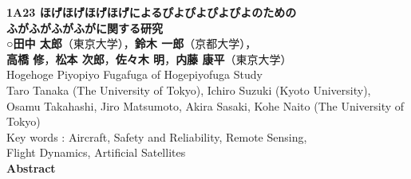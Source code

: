 \documentclass[9pt,a4paper]{ltjsarticle}                %
\begin{document}
\begin{center}
    {\fontsize{16pt}{24pt}\selectfont \textbf{1A23 ほげほげほげほげによるぴよぴよぴよぴよのための}} \\[8pt]
    {\fontsize{16pt}{24pt}\selectfont \textbf{ふがふがふがふがに関する研究}} \\[14pt]

    ○\textbf{田中 太郎}（東京大学），\textbf{鈴木 一郎}（京都大学）， \\
    \textbf{高橋 修}，\textbf{松本 次郎}，\textbf{佐々木 明}，\textbf{内藤 康平}（東京大学） \\[14pt]

    Hogehoge Piyopiyo Fugafuga of Hogepiyofuga Study \\

    Taro Tanaka (The University of Tokyo), Ichiro Suzuki (Kyoto University), \\
    Osamu Takahashi, Jiro Matsumoto, Akira Sasaki, Kohe Naito (The University of Tokyo) \\[14pt]

    Key words :  Aircraft, Safety and Reliability, Remote Sensing, \\
    Flight Dynamics, Artificial Satellites \\[14pt]

    \textbf{Abstract}
\end{center}
\vspace{-2mm}

\lipsum[1-2]
\end{document}
